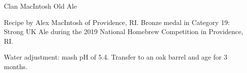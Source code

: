 \stylesection{\styleoldale}

\begin{recipe}{Clan MacIntosh Old Ale} %

\begin{aboutblock}
Recipe by Alex MacIntosh of Providence, RI. Bronze medal in Category 19: Strong
UK Ale during the 2019 National Homebrew Competition in Providence, RI. \sourceaha
\end{aboutblock}


\begin{methodandtiming}
 
\begin{mashsteps}
\end{mashsteps}

\begin{fermentationsteps}
\end{fermentationsteps}

\begin{directions}
Water adjustment: mash pH of 5.4. Transfer to an oak barrel and age for
3 months.
\end{directions}

\end{methodandtiming}

\recipebreak

\begin{ingredientsblock}

\begin{malts}
\end{malts}

\begin{hops}
\end{hops}


\end{ingredientsblock}

\end{recipe}
